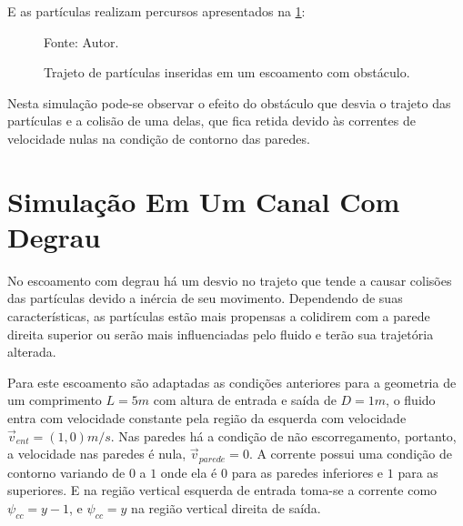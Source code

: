 E as partículas realizam percursos apresentados na \ref{obstacle_trajectory}:
\begin{figure}[H]
    \centering
     {\raggedleft \scriptsize Fonte: Autor.}
    \caption{Trajeto de partículas inseridas em um escoamento com obstáculo.}
    \label{obstacle_trajectory}
\end{figure}

Nesta simulação pode-se observar o efeito do obstáculo que desvia o trajeto das partículas e a colisão de uma delas, que fica retida devido às correntes de velocidade nulas na condição de contorno das paredes.

\section{\textbf{Simulação Em Um Canal Com Degrau}}
\label{sec_step}
No escoamento com degrau há um desvio no trajeto que tende a causar colisões das partículas devido a inércia de seu movimento.
Dependendo de suas características, as partículas estão mais propensas a colidirem com a parede direita superior ou serão mais influenciadas pelo fluido e terão sua trajetória alterada.

Para este escoamento são adaptadas as condições anteriores para a geometria de um comprimento $L=5m$ com altura de entrada e saída de $D=1m$, o fluido entra com velocidade constante pela região da esquerda com velocidade $\vec{v}_{ent}=(1, 0)m/s$.
Nas paredes há a condição de não escorregamento, portanto, a velocidade nas paredes é nula, $\vec{v}_{parede}=0$.
A corrente possui uma condição de contorno variando de $0$ a $1$ onde ela é $0$ para as paredes inferiores e $1$ para as superiores.
E na região vertical esquerda de entrada toma-se a corrente como $\psi_{cc}=y-1$, e $\psi_{cc}=y$ na região vertical direita de saída.

